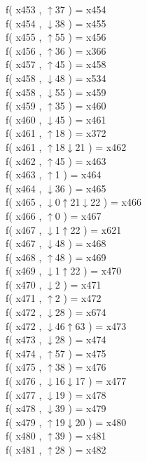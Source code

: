 f( x453 , $\uparrow$37 ) = x454 \\
f( x454 , $\downarrow$38 ) = x455 \\
f( x455 , $\uparrow$55 ) = x456 \\
f( x456 , $\uparrow$36 ) = x366 \\
f( x457 , $\uparrow$45 ) = x458 \\
f( x458 , $\downarrow$48 ) = x534 \\
f( x458 , $\downarrow$55 ) = x459 \\
f( x459 , $\uparrow$35 ) = x460 \\
f( x460 , $\downarrow$45 ) = x461 \\
f( x461 , $\uparrow$18 ) = x372 \\
f( x461 , $\uparrow$18$\downarrow$21 ) = x462 \\
f( x462 , $\uparrow$45 ) = x463 \\
f( x463 , $\uparrow$1 ) = x464 \\
f( x464 , $\downarrow$36 ) = x465 \\
f( x465 , $\downarrow$0$\uparrow$21$\downarrow$22 ) = x466 \\
f( x466 , $\uparrow$0 ) = x467 \\
f( x467 , $\downarrow$1$\uparrow$22 ) = x621 \\
f( x467 , $\downarrow$48 ) = x468 \\
f( x468 , $\uparrow$48 ) = x469 \\
f( x469 , $\downarrow$1$\uparrow$22 ) = x470 \\
f( x470 , $\downarrow$2 ) = x471 \\
f( x471 , $\uparrow$2 ) = x472 \\
f( x472 , $\downarrow$28 ) = x674 \\
f( x472 , $\downarrow$46$\uparrow$63 ) = x473 \\
f( x473 , $\downarrow$28 ) = x474 \\
f( x474 , $\uparrow$57 ) = x475 \\
f( x475 , $\uparrow$38 ) = x476 \\
f( x476 , $\downarrow$16$\downarrow$17 ) = x477 \\
f( x477 , $\downarrow$19 ) = x478 \\
f( x478 , $\downarrow$39 ) = x479 \\
f( x479 , $\uparrow$19$\downarrow$20 ) = x480 \\
f( x480 , $\uparrow$39 ) = x481 \\
f( x481 , $\uparrow$28 ) = x482 \\
